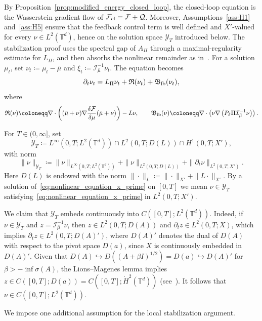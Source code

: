 \documentclass[11pt]{article}
\numberwithin{equation}{section}
\theoremstyle{definition}
\newcommand{\T}{\mathbb{T}}
\newcommand{\F}{\mathcal{F}}
\newcommand{\rieszmap}[1][\mu]{\mathcal{I}_{#1}}
\newcommand{\dotHk}[1][k]{\dot{H}^{#1}}
\begin{document}
By Proposition~\ref{prop:modified_energy_closed_loop}, the closed-loop equation is the Wasserstein gradient flow of $\F_{\rm cl} = \F + \mathcal{Q}$.
Moreover, Assumptions~\ref{ass:H1} and~\ref{ass:H5} ensure that the feedback control term is well defined and $X'$-valued for every $\nu \in L^2(\T^d)$, hence on the solution space $\mathcal{Y}_T$ introduced below.
The stabilization proof uses the spectral gap of $A_\Pi$ through a maximal-regularity estimate for $L_\Pi$, and then absorbs the nonlinear remainder as in~\cite[Section~3.4]{KaliseMoschenPavliotis2025}.
For a solution $\mu_t$, set $\nu_t \coloneqq \mu_t-\bar\mu$ and $\xi_t \coloneqq \rieszmap[\bar\mu]^{-1}\nu_t$.
The equation becomes
\begin{equation}
    \label{eq:nonlinear_equation_x_prime}
    \partial_t \nu_t = L_\Pi\nu_t + \mathfrak{R}(\nu_t) + \mathfrak{B}_{\rm fb}(\nu_t),
\end{equation}
where
\[
\mathfrak{R}(\nu) \coloneqq \nabla\cdot\left((\bar\mu + \nu)\nabla\frac{\delta\F}{\delta\mu}(\bar\mu + \nu)\right) - L\nu, \qquad \mathfrak{B}_{\rm fb}(\nu) \coloneqq \nabla \cdot \left(\nu\nabla\left(P_\delta \Pi \rieszmap[\bar\mu]^{-1}\nu\right)\right).
\]

For \(T \in (0,\infty]\), set
\[
\mathcal{Y}_T \coloneqq L^\infty(0,T; L^2(\T^d)) \cap L^2(0,T; D(L)) \cap H^1(0,T; X'),
\]
with norm
\[
\|\nu\|_{\mathcal{Y}_T} \coloneqq \|\nu\|_{L^\infty(0, T; L^2(\T^d))} + \|\nu\|_{L^2(0, T; D(L))} + \|\partial_t\nu\|_{L^2(0, T; X')}.
\]
Here $D(L)$ is endowed with the norm $\|\cdot\|_{L} \coloneqq \|\cdot\|_{X'} + \|L\cdot\|_{X'}$.
By a solution of~\eqref{eq:nonlinear_equation_x_prime} on $[0,T]$ we mean $\nu \in \mathcal{Y}_T$ satisfying~\eqref{eq:nonlinear_equation_x_prime} in $L^2(0,T;X')$.

We claim that $\mathcal{Y}_T$ embeds continuously into
$C([0, T]; L^2(\T^d))$. 
Indeed, if $\nu \in \mathcal{Y}_T$ and $z = \rieszmap[\bar\mu]^{-1} \nu$, then $z \in L^2(0, T; D(A))$ and $\partial_t z \in L^2(0, T; X)$, which implies $\partial_t z \in L^2(0, T; D(A)')$, where $D(A)'$ denotes the dual of $D(A)$ with respect to the pivot space $D(a)$, since $X$ is continuously embedded in $D(A)'$.
Given that $D(A) \hookrightarrow D((A + \beta I)^{1/2}) = D(a) \hookrightarrow D(A)'$ for $\beta > -\inf \sigma(A)$, the Lions--Magenes lemma implies $z \in C([0, T]; D(a)) = C([0, T]; \dotHk[2](\T^d))$ (see~\cite[Ch. 3, Lem. 1.2]{temam1977navier}). 
It follows that $\nu \in C([0, T]; L^2(\T^d))$.

We impose one additional assumption for the local stabilization argument.
\end{document}
